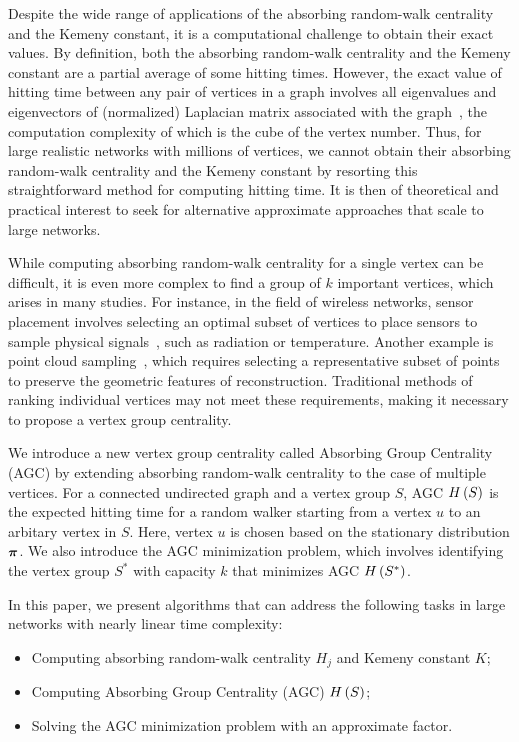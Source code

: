 \documentclass[journal]{IEEEtran}
\begin{document}
Despite the wide range of applications of the absorbing random-walk centrality and the Kemeny constant, it is a computational challenge to obtain their exact values.
By definition, both the absorbing random-walk centrality and the Kemeny constant are a partial average of some hitting times.
However, the exact value of hitting time between any pair of vertices in a graph involves all eigenvalues and eigenvectors of (normalized) Laplacian matrix associated with the graph~\cite{Lo93,LiZh13PRE}, the computation complexity of which is the cube of the vertex number.
Thus, for large realistic networks with millions of vertices, we cannot obtain their absorbing random-walk centrality and the Kemeny constant by resorting this straightforward method for computing hitting time.
It is then of theoretical and practical interest to seek for alternative approximate approaches that scale to large networks.

While computing absorbing random-walk centrality for a single vertex can be difficult, it is even more complex to find a group of \(k\) important vertices, which arises in many studies.
For instance, in the field of wireless networks, sensor placement involves selecting an optimal subset of vertices to place sensors to sample physical signals~\cite{KrSiGu08,RaChVe13}, such as radiation or temperature.
Another example is point cloud sampling~\cite{DiChWaBa20,ChTiFeVeKo17}, which requires selecting a representative subset of points to preserve the geometric features of reconstruction.
Traditional methods of ranking individual vertices may not meet these requirements, making it necessary to propose a vertex group centrality.

We introduce a new vertex group centrality called Absorbing Group Centrality (AGC) by extending absorbing random-walk centrality to the case of multiple vertices.
For a connected undirected graph and a vertex group \(S\), AGC \(H\left(S\right)\) is the expected hitting time for a random walker starting from a vertex \(u\) to an arbitary vertex in \(S\). Here, vertex \(u\) is chosen based on the stationary distribution \(\boldsymbol{\pi}\).
We also introduce the AGC minimization problem, which involves identifying the vertex group \(S^*\) with capacity \(k\) that minimizes AGC \(H\left(S^*\right)\).

In this paper, we present algorithms that can address the following tasks in large networks with nearly linear time complexity:
\begin{itemize}
    \item Computing absorbing random-walk centrality \(H_j\) and Kemeny constant \(K\);
    \item Computing Absorbing Group Centrality (AGC) \(H\left(S\right)\);
    \item Solving the AGC minimization problem with an approximate factor.
\end{itemize}
\end{document}
